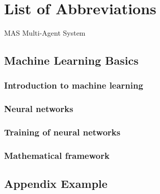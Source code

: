 \documentclass[12pt, a4paper]{report}
\begin{document}
	\chapter*{List of Abbreviations}
	\begin{abbreviations}
		\item[MAS] Multi-Agent System
	\end{abbreviations}
	
	\section{Machine Learning Basics}
	
	\subsection{Introduction to machine learning}
	
	\subsection{Neural networks}
	
	\subsection{Training of neural networks}
	
	\subsection{Mathematical framework}
	
	
	
	\nocite{*}
	\printbibliography[title=Literature]
	\begin{appendices}
		\chapter{Appendix Example}
	\end{appendices}
	
\end{document}
